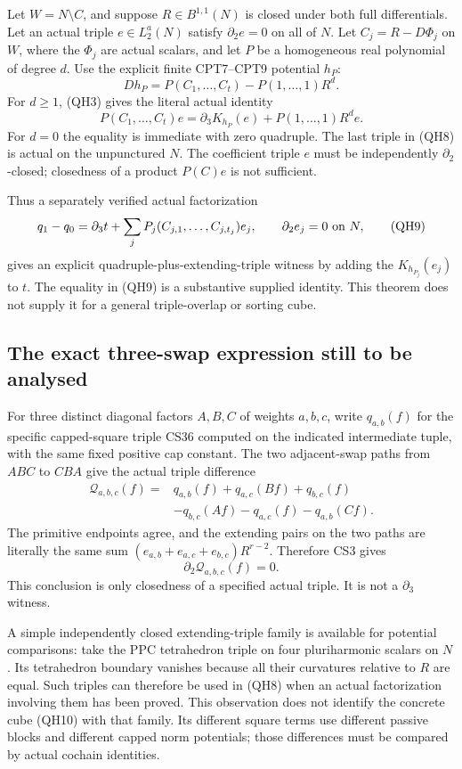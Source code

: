 Let $W=N\setminus C$, and suppose $R\in B^{1,1}(N)$ is closed
under both full differentials.  Let an actual triple
$e\in L_2^a(N)$ satisfy $\partial_2e=0$ on all of $N$.
Let $C_j=R-D\Phi_j$ on $W$, where the
$\Phi_j$ are actual scalars, and let $P$ be a homogeneous real
polynomial of degree $d$.  Use the explicit finite CPT7--CPT9
potential $h_P$:
\[
             Dh_P=P(C_1,\ldots,C_t)-P(1,\ldots,1)R^d.
 \tag{QH7}
\]
For $d\ge1$, (QH3) gives the literal actual identity
\[
 P(C_1,\ldots,C_t)e
        =\partial_3K_{h_P}(e)
                     +P(1,\ldots,1)R^d e.
 \tag{QH8}
\]
For $d=0$ the equality is immediate with zero quadruple.  The
last triple in (QH8) is actual on the unpunctured $N$.  The
coefficient triple $e$ must be independently $\partial_2$-closed;
closedness of a product $P(C)e$ is not sufficient.

Thus a separately verified actual factorization
\[
            q_1-q_0=\partial_3t+
                   \sum_jP_j(C_{j,1},\ldots,C_{j,t_j})e_j,
 \qquad \partial_2e_j=0\ \hbox{on }N,
 \tag{QH9}
\]
gives an explicit quadruple-plus-extending-triple witness by
adding the $K_{h_{P_j}}(e_j)$ to $t$.  The equality in (QH9)
is a substantive supplied identity.  This theorem does not
supply it for a general triple-overlap or sorting cube.

\subsection{The exact three-swap expression still to be analysed}

For three distinct diagonal factors $A,B,C$ of weights $a,b,c$,
write $q_{a,b}(f)$ for the specific capped-square triple CS36
computed on the indicated intermediate tuple, with the same
fixed positive cap constant.  The two adjacent-swap paths from
$ABC$ to $CBA$ give the actual triple difference
\[
 \begin{split}
 \mathcal Q_{a,b,c}(f)={}&q_{a,b}(f)+q_{a,c}(Bf)+q_{b,c}(f)\\
                      &-q_{b,c}(Af)-q_{a,c}(f)-q_{a,b}(Cf).
 \end{split}
 \tag{QH10}
\]
The primitive endpoints agree, and the extending pairs on the
two paths are literally the same sum
$(e_{a,b}+e_{a,c}+e_{b,c})R^{r-2}$.  Therefore CS3 gives
\[
                         \partial_2\mathcal Q_{a,b,c}(f)=0.
 \tag{QH11}
\]
This conclusion is only closedness of a specified actual triple.
It is not a $\partial_3$ witness.

A simple independently closed extending-triple family is
available for potential comparisons: take the PPC tetrahedron
triple on four pluriharmonic scalars on $N$.  Its tetrahedron
boundary vanishes because all their curvatures relative to $R$
are equal.  Such triples can therefore be used in (QH8) when
an actual factorization involving them has been proved.  This
observation does not identify the concrete cube (QH10) with
that family.  Its different square terms use different passive
blocks and different capped norm potentials; those differences
must be compared by actual cochain identities.

